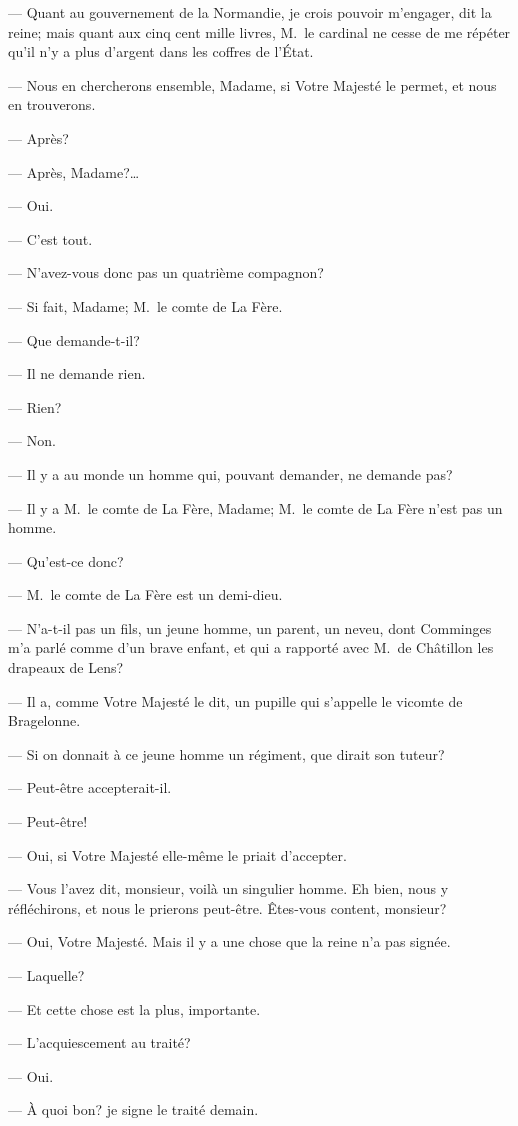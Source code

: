 — Quant au gouvernement de la Normandie, je crois pouvoir m'engager, dit la reine; mais quant aux cinq cent mille livres, M.~le cardinal ne cesse de me répéter qu'il n'y a plus d'argent dans les coffres de l'État.

— Nous en chercherons ensemble, Madame, si Votre Majesté le permet, et nous en trouverons.

— Après?

— Après, Madame?\dots

— Oui.

— C'est tout.

— N'avez-vous donc pas un quatrième compagnon?

— Si fait, Madame; M.~le comte de La Fère.

— Que demande-t-il?

— Il ne demande rien.

— Rien?

— Non.

— Il y a au monde un homme qui, pouvant demander, ne demande pas?

— Il y a M.~le comte de La Fère, Madame; M.~le comte de La Fère n'est pas un homme.

— Qu'est-ce donc?

— M.~le comte de La Fère est un demi-dieu.

— N'a-t-il pas un fils, un jeune homme, un parent, un neveu, dont Comminges m'a parlé comme d'un brave enfant, et qui a rapporté avec M.~de Châtillon les drapeaux de Lens?

— Il a, comme Votre Majesté le dit, un pupille qui s'appelle le vicomte de Bragelonne.

— Si on donnait à ce jeune homme un régiment, que dirait son tuteur?

— Peut-être accepterait-il.

— Peut-être!

— Oui, si Votre Majesté elle-même le priait d'accepter.

— Vous l'avez dit, monsieur, voilà un singulier homme. Eh bien, nous y réfléchirons, et nous le prierons peut-être. Êtes-vous content, monsieur?

— Oui, Votre Majesté. Mais il y a une chose que la reine n'a pas signée.

— Laquelle?

— Et cette chose est la plus, importante.

— L'acquiescement au traité?

— Oui.

— À quoi bon? je signe le traité demain.


